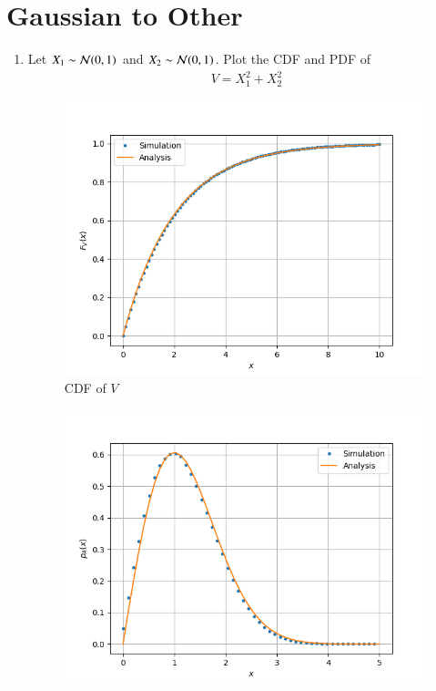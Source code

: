 \documentclass[journal,12pt,twocolumn]{IEEEtran}
\renewcommand\thesection{\arabic{section}}
\begin{document}
\section{Gaussian to Other}
\begin{enumerate}[label=\thesection.\arabic*
,ref=\thesection.\theenumi]
\item Let $X_1 \sim \mathcal{N}(0, 1)$ and $X_2 \sim \mathcal{N}(0, 1)$. Plot the CDF and PDF of
	\begin{align}
		V = X_1^2 + X_2^2
	\end{align}

\solution
		\begin{figure}
			\includegraphics[width=\columnwidth]{figs/6_1_cdf.png}
			\caption{CDF of $V$}
			\label{fig:chi-cdf}
		\end{figure}
		\begin{figure}
			\includegraphics[width=\columnwidth]{figs/6_1_pdf.png}

\end{figure}
\end{enumerate}
\end{document}
